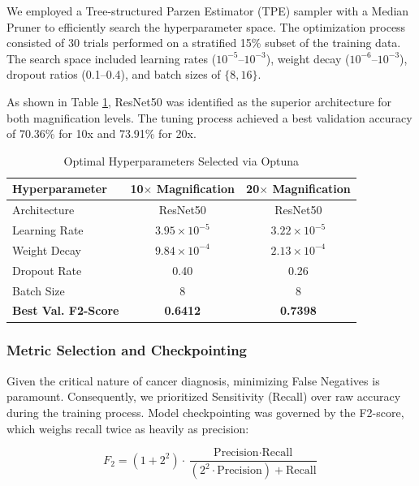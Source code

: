 \documentclass[conference]{IEEEtran}
\begin{document}
We employed a Tree-structured Parzen Estimator (TPE) sampler with a Median Pruner to efficiently search the hyperparameter space. The optimization process consisted of 30 trials performed on a stratified 15\% subset of the training data. The search space included learning rates ($10^{-5}$--$10^{-3}$), weight decay ($10^{-6}$--$10^{-3}$), dropout ratios (0.1--0.4), and batch sizes of $\{8, 16\}$.

As shown in Table \ref{tab:hyperparams}, ResNet50 was identified as the superior architecture for both magnification levels. The tuning process achieved a best validation accuracy of 70.36\% for 10x and 73.91\% for 20x.

\begin{table}[H]
\caption{Optimal Hyperparameters Selected via Optuna}
\begin{center}
\begin{tabular}{lcc}
\toprule
\textbf{Hyperparameter} & \textbf{10$\times$ Magnification} & \textbf{20$\times$ Magnification} \\
\midrule
Architecture & ResNet50 & ResNet50 \\
Learning Rate & $3.95 \times 10^{-5}$ & $3.22 \times 10^{-5}$ \\
Weight Decay & $9.84 \times 10^{-4}$ & $2.13 \times 10^{-4}$ \\
Dropout Rate & 0.40 & 0.26 \\
Batch Size & 8 & 8 \\
\midrule
\textbf{Best Val. F2-Score} & \textbf{0.6412} & \textbf{0.7398} \\
\bottomrule
\end{tabular}
\label{tab:hyperparams}
\end{center}
\end{table}

\subsubsection{Metric Selection and Checkpointing}
Given the critical nature of cancer diagnosis, minimizing False Negatives is paramount. Consequently, we prioritized Sensitivity (Recall) over raw accuracy during the training process. Model checkpointing was governed by the F2-score, which weighs recall twice as heavily as precision:

\begin{equation}
    F_2 = (1 + 2^2) \cdot \frac{\text{Precision} \cdot \text{Recall}}{(2^2 \cdot \text{Precision}) + \text{Recall}}
\label{eq:f2_score}
\end{equation}
\end{document}
